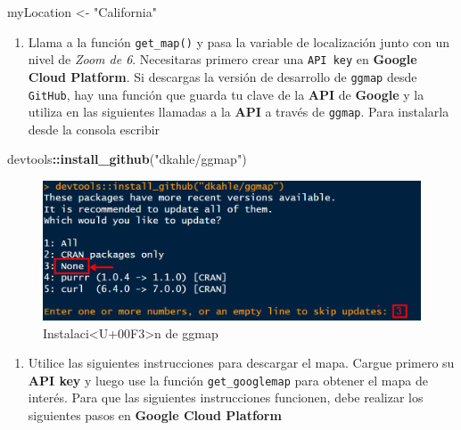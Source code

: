 \documentclass[
]{book}
\newenvironment{Shaded}{\begin{snugshade}}{\end{snugshade}}
\newcommand{\FunctionTok}[1]{\textcolor[rgb]{0.13,0.29,0.53}{\textbf{#1}}}
\newcommand{\NormalTok}[1]{#1}
\newcommand{\OtherTok}[1]{\textcolor[rgb]{0.56,0.35,0.01}{#1}}
\newcommand{\SpecialCharTok}[1]{\textcolor[rgb]{0.81,0.36,0.00}{\textbf{#1}}}
\newcommand{\StringTok}[1]{\textcolor[rgb]{0.31,0.60,0.02}{#1}}
\providecommand{\tightlist}{%
  \setlength{\itemsep}{0pt}\setlength{\parskip}{0pt}}
\begin{document}
\begin{Shaded}
\begin{Highlighting}[]
\NormalTok{myLocation }\OtherTok{\textless{}{-}} \StringTok{"California"}
\end{Highlighting}
\end{Shaded}

\begin{enumerate}
\def\labelenumi{\arabic{enumi}.}
\setcounter{enumi}{2}
\tightlist
\item
  Llama a la función \texttt{get\_map()} y pasa la variable de localización junto con un nivel de \emph{Zoom de 6}. Necesitaras primero crear una \texttt{API\ key} en \textbf{Google Cloud Platform}. Si descargas la versión de desarrollo de \texttt{ggmap} desde \texttt{GitHub}, hay una función que guarda tu clave de la \textbf{API} de \textbf{Google} y la utiliza en las siguientes llamadas a la \textbf{API} a través de \texttt{ggmap}. Para instalarla desde la consola escribir
\end{enumerate}

\begin{Shaded}
\begin{Highlighting}[]
\NormalTok{devtools}\SpecialCharTok{::}\FunctionTok{install\_github}\NormalTok{(}\StringTok{"dkahle/ggmap"}\NormalTok{)}
\end{Highlighting}
\end{Shaded}

\begin{figure}

{\centering \includegraphics[width=0.7\linewidth]{images/map1} 

}

\caption{Instalaci<U+00F3>n de ggmap}\label{fig:mp-fig-a}
\end{figure}

\begin{enumerate}
\def\labelenumi{\arabic{enumi}.}
\setcounter{enumi}{3}
\tightlist
\item
  Utilice las siguientes instrucciones para descargar el mapa. Cargue primero su \textbf{API key} y luego use la función \texttt{get\_googlemap} para obtener el mapa de interés. Para que las siguientes instrucciones funcionen, debe realizar los siguientes pasos en \textbf{Google Cloud Platform}
\end{enumerate}
\end{document}
